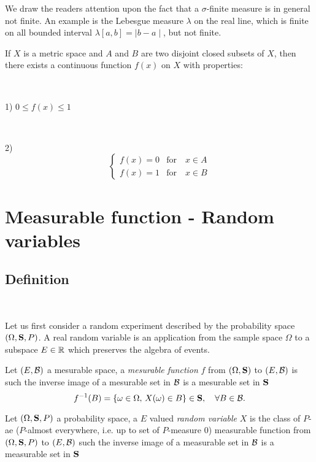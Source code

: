 \begin{remark}
We draw the readers attention upon the fact that a $\sigma$-finite measure is in general not finite. An example is
the Lebesgue measure $\lambda$ on the real line, which is finite on all bounded
interval $\lambda[ a,b] = \mid b-a\mid$, but not finite.
\end{remark}

 \begin{ex}\label{Ex:Borel}
   If $X$ is a metric  space and $A$ and $B$ are two disjoint closed subsets of $X$, then there exists a continuous function $f(x)$ on $X$ with properties: 

   \,

   1) $0\leq f(x)\leq 1$

\, 

   2) \[\begin{cases}
       f(x)=0 & \text{for} \quad  x\in A \\
       f(x)=1 & \text{for} \quad x\in B
   \end{cases}\]
    
   \end{ex} 

\section{Measurable function - Random variables}\label{sec:rand}

\subsection{Definition}
\ 

Let us first consider  a random experiment described by the probability
space $(\Omega,\mathbf{S},P)$.  A real random variable is an application from the sample space
$\Omega$ to a subspace $E\in \mathbb{R}$  which preserves the
algebra of events. 
 
 \begin{definition}
  Let $(E, \mathcal{B})$ a mesurable space, a \emph{mesurable function} $f$ from
$(\Omega,\mathbf{S})$ to  $(E, \mathcal{B})$ is  such the inverse image 
of a mesurable set in $\mathcal{B}$ is a mesurable set in  $\mathbf{S}$
\[ 
f^{-1}(B)=\{\omega \in \Omega,\, X(\omega) \in B\} \in \mathbf{S}, \quad \forall B\in
\mathcal{B}.
\]
\end{definition}

\begin{definition}
  Let $(\Omega, \mathbf{S},P)$ a probability space, a $E$ valued \emph{random variable} $X$ is the class of $P$-ae ($P$-almost everywhere, i.e. up to set of $P$-measure $0$)  measurable function  from $(\Omega,\mathbf{S},P)$ to  $(E, \mathcal{B})$   such the inverse image of a measurable set in $\mathcal{B}$ is a measurable set in  $\mathbf{S}$

\end{definition}


